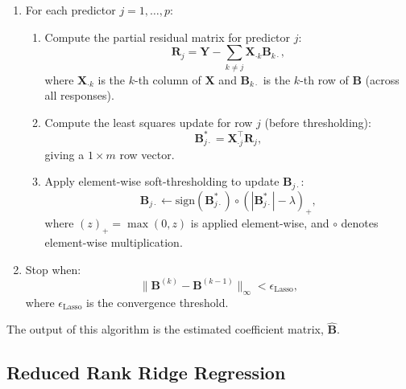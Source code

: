 \documentclass[11pt]{report} %
\begin{document}
\begin{enumerate}
    \item For each predictor $j = 1, \dots, p$:
    \begin{enumerate}
        \item Compute the partial residual matrix for predictor $j$:
        \[
        \mathbf{R}_j = \mathbf{Y} - \sum_{k \neq j} \mathbf{X}_{\cdot k} \mathbf{B}_{k\cdot},
        \]
        where $\mathbf{X}_{\cdot k}$ is the $k$-th column of $\mathbf{X}$ and $\mathbf{B}_{k\cdot}$ is the $k$-th row of $\mathbf{B}$ (across all responses).
        
        \item Compute the least squares update for row $j$ (before thresholding):
        \[
        \mathbf{B}_{j\cdot}^* = \mathbf{X}_{\cdot j}^\top \mathbf{R}_j,
        \]
        giving a $1 \times m$ row vector.
        
        \item Apply element-wise soft-thresholding to update $\mathbf{B}_{j\cdot}$:
        \[
        \mathbf{B}_{j\cdot} \leftarrow \text{sign}(\mathbf{B}_{j\cdot}^*) \circ \left( |\mathbf{B}_{j\cdot}^*| - \lambda \right)_+,
        \]
        where $(z)_+ = \max(0, z)$ is applied element-wise, and $\circ$ denotes element-wise multiplication.
    \end{enumerate}
    \item Stop when:
    \[
    \|\mathbf{B}^{(k)} - \mathbf{B}^{(k-1)}\|_{\infty} < \epsilon_\text{Lasso},
    \]
    where $\epsilon_\text{Lasso}$ is the convergence threshold.\cite{liu2009blockwise}
\end{enumerate}

\noindent The output of this algorithm is the estimated coefficient matrix, $\hat{\mathbf{B}}$.


\subsection{Reduced Rank Ridge Regression}
\end{document}
